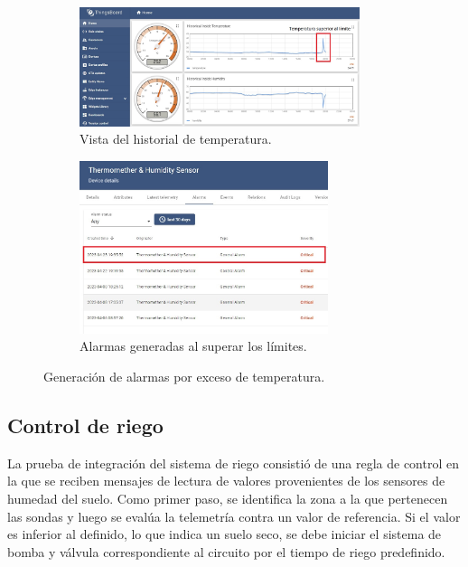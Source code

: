 \begin{figure}[htpb]
     \centering
       \begin{subfigure}[b]{0.8\textwidth}
	    \centering
		 \includegraphics[width=0.9\textwidth]{./Figures/chapter4/temperature.jpg}
		\caption{Vista del historial de temperatura.}
		\label{fig:temp_graph}
     \end{subfigure}
          \hfill
     \begin{subfigure}[b]{0.80\textwidth}
		\centering
		\includegraphics[width=0.80\textwidth]{./Figures/chapter4/temp_alarm.jpg}
		\caption{Alarmas generadas al superar los límites.}
		\label{fig:temp_alarm}
     \end{subfigure}
     \hfill
        \caption[Generación de alarmas por exceso de temperatura]{Generación de alarmas por exceso de temperatura.}
        \label{fig:tb_concurrencia}
\end{figure}


\pagebreak
\subsection{Control de riego}
\label{sec:Control de riego}

La prueba de integración del sistema de riego consistió de una regla de control en la que se reciben mensajes de lectura de valores provenientes de los sensores de humedad del suelo. Como primer paso, se identifica la zona a la que pertenecen las sondas y luego se evalúa la telemetría contra un valor de referencia. Si el valor es inferior al definido, lo que indica un suelo seco, se debe iniciar el sistema de bomba y válvula correspondiente al circuito por el tiempo de riego predefinido. 

